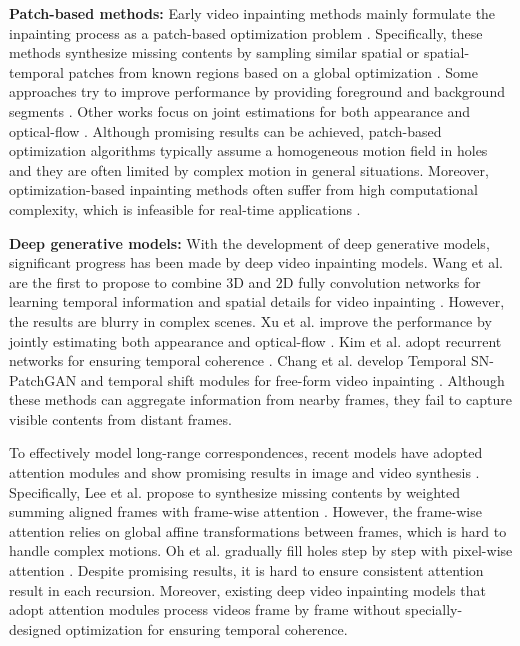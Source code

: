 \documentclass[runningheads]{llncs}
\begin{document}
\textbf{Patch-based methods:} 
Early video inpainting methods mainly formulate the inpainting process as a patch-based optimization problem \cite{barnes2009patchmatch,criminisi2004region,patwardhan2005video,wexler2007space}. 
Specifically, these methods synthesize missing contents by sampling similar spatial or spatial-temporal patches from known regions based on a global optimization \cite{newson2014video,patwardhan2007video,wexler2007space}. Some approaches try to improve performance by providing foreground and background segments \cite{granados2012not,patwardhan2005video}. Other works focus on joint estimations for both appearance and optical-flow \cite{huang2016temporally,matsushita2006full}. 
Although promising results can be achieved, patch-based optimization algorithms typically assume a homogeneous motion field in holes and they are often limited by complex motion in general situations. 
Moreover, optimization-based inpainting methods often suffer from high computational complexity, which is infeasible for real-time applications \cite{xu2019deep}.

\textbf{Deep generative models:} 
With the development of deep generative models, significant progress has been made by deep video inpainting models. Wang et al. are the first to propose to combine 3D and 2D fully convolution networks for learning temporal information and spatial details for video inpainting \cite{wang2019video}. However, the results are blurry in complex scenes. Xu et al. improve the performance by jointly estimating both appearance and optical-flow \cite{xu2019deep,zhang2019internal}. Kim et al. adopt recurrent networks for ensuring temporal coherence \cite{kim2019deep}. Chang et al. develop Temporal SN-PatchGAN \cite{yu2019free} and temporal shift modules \cite{lin2019tsm} for free-form video inpainting \cite{chang2019free}. 
Although these methods can aggregate information from nearby frames, they fail to capture visible contents from distant frames. 

To effectively model long-range correspondences, recent models have adopted attention modules and show promising results in image and video synthesis \cite{ma2018gan,yang2020learning,zeng2019learning}.
Specifically, Lee et al. propose to synthesize missing contents by weighted summing aligned frames with frame-wise attention \cite{lee2019copy}. However, the frame-wise attention relies on global affine transformations between frames, which is hard to handle complex motions. 
Oh et al. gradually fill holes step by step with pixel-wise attention \cite{oh2019onion}. Despite promising results, it is hard to ensure consistent attention result in each recursion. Moreover, existing deep video inpainting models that adopt attention modules process videos frame by frame without specially-designed optimization for ensuring temporal coherence. 
\end{document}
